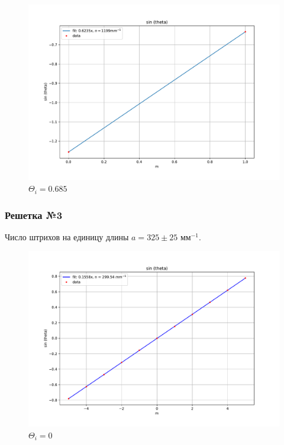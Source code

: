\documentclass[a4paper, 12pt]{article}
\begin{document}
\begin{figure}[H]
	\centering
	\includegraphics[scale=0.55]{2_1}
	\caption{$ \Theta_i = 0.685$}
\end{figure}




\subsubsection{Решетка №3}
Число штрихов на единицу длины $a = 325 \pm 25 \text{ мм}^{-1}$.

\begin{figure}[H]
	\centering
	\includegraphics[scale=0.55]{3_0}
	\caption{$ \Theta_i = 0$}
\end{figure}
\end{document}
